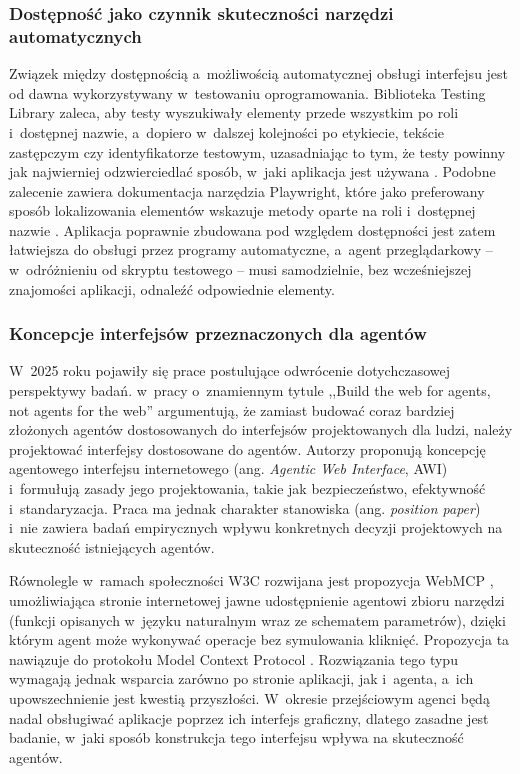 \subsubsection{Dostępność jako czynnik skuteczności narzędzi automatycznych}
Związek między dostępnością a~możliwością automatycznej obsługi interfejsu jest od dawna wykorzystywany w~testowaniu oprogramowania. Biblioteka Testing Library zaleca, aby testy wyszukiwały elementy przede wszystkim po roli i~dostępnej nazwie, a~dopiero w~dalszej kolejności po etykiecie, tekście zastępczym czy identyfikatorze testowym, uzasadniając to tym, że testy powinny jak najwierniej odzwierciedlać sposób, w~jaki aplikacja jest używana \citep{testinglibrary2025priority}. Podobne zalecenie zawiera dokumentacja narzędzia Playwright, które jako preferowany sposób lokalizowania elementów wskazuje metody oparte na roli i~dostępnej nazwie \citep{playwright2025locators}. Aplikacja poprawnie zbudowana pod względem dostępności jest zatem łatwiejsza do obsługi przez programy automatyczne, a~agent przeglądarkowy -- w~odróżnieniu od skryptu testowego -- musi samodzielnie, bez wcześniejszej znajomości aplikacji, odnaleźć odpowiednie elementy.

\subsubsection{Koncepcje interfejsów przeznaczonych dla agentów}
W~2025 roku pojawiły się prace postulujące odwrócenie dotychczasowej perspektywy badań. \cite{lu2025awi} w~pracy o~znamiennym tytule ,,Build the web for agents, not agents for the web'' argumentują, że zamiast budować coraz bardziej złożonych agentów dostosowanych do interfejsów projektowanych dla ludzi, należy projektować interfejsy dostosowane do agentów. Autorzy proponują koncepcję agentowego interfejsu internetowego (ang. \textit{Agentic Web Interface}, AWI) i~formułują zasady jego projektowania, takie jak bezpieczeństwo, efektywność i~standaryzacja. Praca ma jednak charakter stanowiska (ang. \textit{position paper}) i~nie zawiera badań empirycznych wpływu konkretnych decyzji projektowych na skuteczność istniejących agentów.

Równolegle w~ramach społeczności W3C rozwijana jest propozycja WebMCP \citep{w3c2025webmcp}, umożliwiająca stronie internetowej jawne udostępnienie agentowi zbioru narzędzi (funkcji opisanych w~języku naturalnym wraz ze schematem parametrów), dzięki którym agent może wykonywać operacje bez symulowania kliknięć. Propozycja ta nawiązuje do protokołu Model Context Protocol \citep{anthropic2024mcp}. Rozwiązania tego typu wymagają jednak wsparcia zarówno po stronie aplikacji, jak i~agenta, a~ich upowszechnienie jest kwestią przyszłości. W~okresie przejściowym agenci będą nadal obsługiwać aplikacje poprzez ich interfejs graficzny, dlatego zasadne jest badanie, w~jaki sposób konstrukcja tego interfejsu wpływa na skuteczność agentów.

